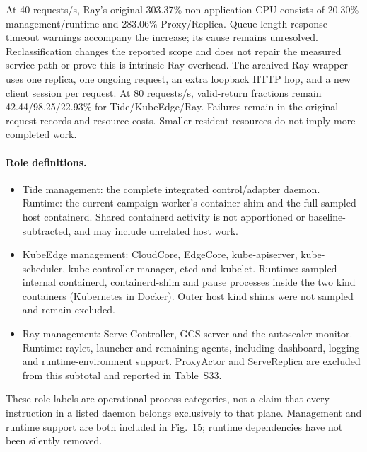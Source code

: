 At 40 requests/s, Ray's original 303.37\% non-application CPU consists of 20.30\% management/runtime and 283.06\% Proxy/Replica. Queue-length-response timeout warnings accompany the increase; its cause remains unresolved. Reclassification changes the reported scope and does not repair the measured service path or prove this is intrinsic Ray overhead. The archived Ray wrapper uses one replica, one ongoing request, an extra loopback HTTP hop, and a new client session per request. At 80 requests/s, valid-return fractions remain 42.44/98.25/22.93\% for Tide/KubeEdge/Ray. Failures remain in the original request records and resource costs. Smaller resident resources do not imply more completed work.

\clearpage
\paragraph{Role definitions.}
\begin{itemize}
\item Tide management: the complete integrated control/adapter daemon. Runtime: the current campaign worker's container shim and the full sampled host containerd. Shared containerd activity is not apportioned or baseline-subtracted, and may include unrelated host work.
\item KubeEdge management: CloudCore, EdgeCore, kube-apiserver, kube-scheduler, kube-controller-manager, etcd and kubelet. Runtime: sampled internal containerd, containerd-shim and pause processes inside the two kind containers (Kubernetes in Docker). Outer host kind shims were not sampled and remain excluded.
\item Ray management: Serve Controller, GCS server and the autoscaler monitor. Runtime: raylet, launcher and remaining agents, including dashboard, logging and runtime-environment support. ProxyActor and ServeReplica are excluded from this subtotal and reported in Table~S33.
\end{itemize}
These role labels are operational process categories, not a claim that every instruction in a listed daemon belongs exclusively to that plane. Management and runtime support are both included in Fig.~15; runtime dependencies have not been silently removed.

